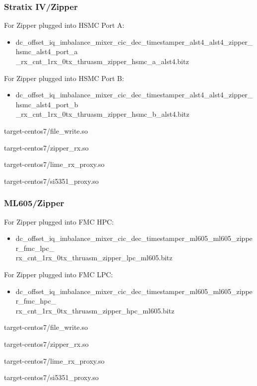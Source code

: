 \subsubsection{Stratix IV/Zipper}
	For Zipper plugged into HSMC Port A:
	\begin{itemize}
	\item
dc\_offset\_iq\_imbalance\_mixer\_cic\_dec\_timestamper\_alst4\_alst4\_zipper\_hsmc\_alst4\_port\_a \\ \_rx\_cnt\_1rx\_0tx\_thruasm\_zipper\_hsmc\_a\_alst4.bitz
 	\end{itemize}
	\noindent For Zipper plugged into HSMC Port B:
	\begin{itemize}
	\item	dc\_offset\_iq\_imbalance\_mixer\_cic\_dec\_timestamper\_alst4\_alst4\_zipper\_hsmc\_alst4\_port\_b \\ \_rx\_cnt\_1rx\_0tx\_thruasm\_zipper\_hsmc\_b\_alst4.bitz
	\end{itemize}
	\begin{itemize}
	\begin{minipage}[t]{.5\textwidth}
	\item target-centos7/file\_write.so
	\item target-centos7/zipper\_rx.so
	\end{minipage}
	\begin{minipage}[t]{.5\textwidth}
	\item target-centos7/lime\_rx\_proxy.so
	\item target-centos7/si5351\_proxy.so
	\end{minipage}
	\end{itemize}
\subsubsection{ML605/Zipper}
	For Zipper plugged into FMC HPC:
	\begin{itemize}
	\item
dc\_offset\_iq\_imbalance\_mixer\_cic\_dec\_timestamper\_ml605\_ml605\_zipper\_fmc\_lpc\_ \\ rx\_cnt\_1rx\_0tx\_thruasm\_zipper\_lpc\_ml605.bitz
 	\end{itemize}
	\noindent For Zipper plugged into FMC LPC:
	\begin{itemize}
	\item
dc\_offset\_iq\_imbalance\_mixer\_cic\_dec\_timestamper\_ml605\_ml605\_zipper\_fmc\_hpc\_ \\
rx\_cnt\_1rx\_0tx\_thruasm\_zipper\_hpc\_ml605.bitz
	\end{itemize}
	\begin{itemize}
	\begin{minipage}[t]{.5\textwidth}
	\item target-centos7/file\_write.so
	\item target-centos7/zipper\_rx.so
	\end{minipage}
	\begin{minipage}[t]{.5\textwidth}
	\item target-centos7/lime\_rx\_proxy.so
	\item target-centos7/si5351\_proxy.so
	\end{minipage}
	\end{itemize}

